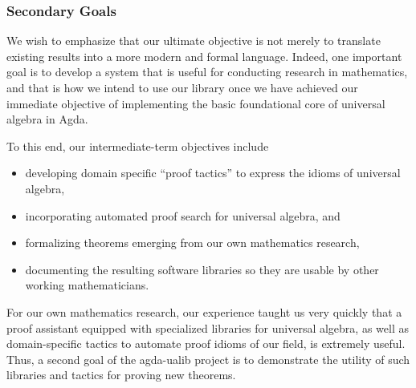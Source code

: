 \documentclass[sigplan,screen]{acmart}
\begin{document}
\subsubsection{Secondary Goals}\label{secondary-goals}
We wish to emphasize that our ultimate objective is not merely to translate existing results into a more modern and formal language. Indeed, one important goal is to develop a system that is useful for conducting research in mathematics, and that is how we intend to use our library once we have achieved our immediate objective of implementing
the basic foundational core of universal algebra in Agda.

To this end, our intermediate-term objectives include
\begin{itemize}
\item developing domain specific ``proof tactics'' to express the idioms of universal algebra,
\item incorporating automated proof search for universal algebra, and
\item formalizing theorems emerging from our own mathematics research,
\item documenting the resulting software libraries so they are usable by other working mathematicians.
\end{itemize}

For our own mathematics research, our experience taught us very quickly that a proof assistant equipped with specialized libraries for universal algebra, as well as domain-specific tactics to automate proof idioms of our field, is extremely useful. Thus, a second goal of the agda-ualib project is to demonstrate the utility of such libraries and tactics for proving new theorems.


\end{document}
